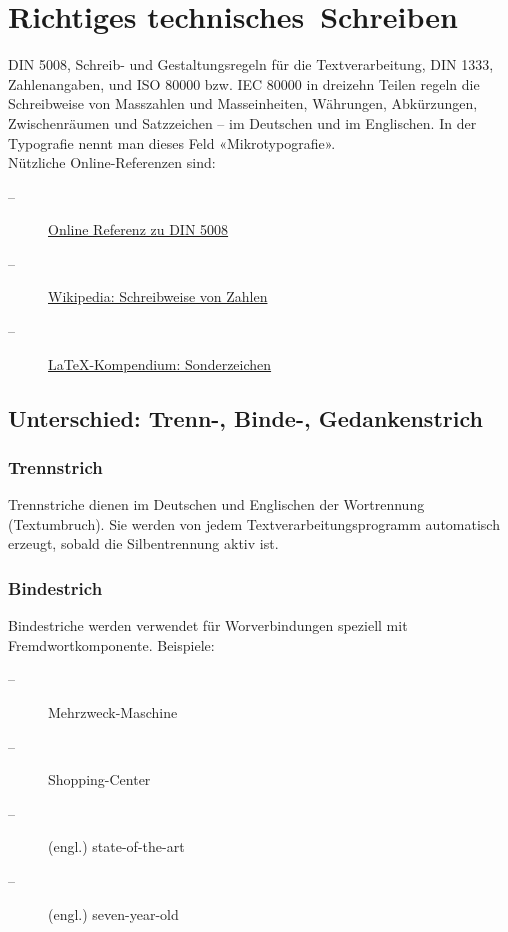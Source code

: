 \chapter{Richtiges technisches~Schreiben}
\label{sec:technischesSchreiben}

DIN 5008, Schreib- und Gestaltungsregeln für die Textverarbeitung, DIN 1333, Zahlenangaben, und ISO 80000 bzw. IEC 80000 in dreizehn Teilen regeln die Schreibweise von Masszahlen und Masseinheiten, Währungen, Abkürzungen, Zwischenräumen und Satzzeichen -- im Deutschen und im Englischen. In der Typografie nennt man dieses Feld «Mikro\-typografie». \\

Nützliche Online-Referenzen sind:
\begin{description}
  \item[--] \href{https://din-5008-richtlinien.de}{Online Referenz zu DIN 5008}
  \item[--] \href{https://de.wikipedia.org/wiki/Schreibweise_von_Zahlen}{Wikipedia: Schreibweise von Zahlen}
  \item[--] \href{https://de.wikibooks.org/wiki/LaTeX-Kompendium:_Sonderzeichen}{LaTeX-Kompendium: Sonderzeichen}
\end{description}

\section{Unterschied: Trenn-, Binde-, Gedankenstrich}

\subsection{Trennstrich}

Trennstriche dienen im Deutschen und Englischen der Wortrennung (Textumbruch). Sie werden von jedem Text\-verarbeitungsprogramm automatisch erzeugt, sobald die Silbentrennung aktiv ist.

\subsection{Bindestrich} 

Bindestriche werden verwendet für Worverbindungen speziell mit Fremdwortkomponente. Beispiele:
\begin{description}
  \item[--] Mehrzweck-Maschine
  \item[--] Shopping-Center
  \item[--] (engl.) state-of-the-art
  \item[--] (engl.) seven-year-old
\end{description}

